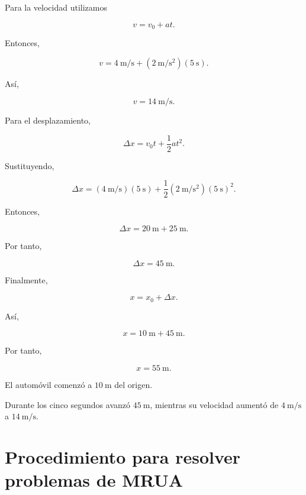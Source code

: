 Para la velocidad utilizamos

\[ v=v_0+at. \]

Entonces,

\[
v
=
\SI{4}{\meter\per\second}
+
\left(\SI{2}{\meter\per\second\squared}\right)
\left(\SI{5}{\second}\right).
\]

Así,

\[ \boxed{v=\SI{14}{\meter\per\second}}. \]

Para el desplazamiento,

\[ \Delta x=v_0t+\frac{1}{2}at^2. \]

Sustituyendo,

\[
\Delta x
=
\left(\SI{4}{\meter\per\second}\right)
\left(\SI{5}{\second}\right)
+
\frac{1}{2}
\left(\SI{2}{\meter\per\second\squared}\right)
\left(\SI{5}{\second}\right)^2.
\]

Entonces,

\[
\Delta x
=
\SI{20}{\meter}
+
\SI{25}{\meter}.
\]

Por tanto,

\[ \boxed{\Delta x=\SI{45}{\meter}}. \]

Finalmente,

\[
x=x_0+\Delta x.
\]

Así,

\[
x
=
\SI{10}{\meter}
+
\SI{45}{\meter}.
\]

Por tanto,

\[ \boxed{x=\SI{55}{\meter}}. \]

\begin{interpretacion}
El automóvil comenzó a \(\SI{10}{\meter}\) del origen.

Durante los cinco segundos avanzó \(\SI{45}{\meter}\), mientras su velocidad
aumentó de \(\SI{4}{\meter\per\second}\) a
\(\SI{14}{\meter\per\second}\).
\end{interpretacion}


\section{Procedimiento para resolver problemas de MRUA}


